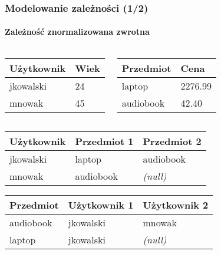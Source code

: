 \documentclass{beamer}
\begin{document}
	\begin{frame}
		\frametitle{Modelowanie zależności (1/2)}
		\framesubtitle{Zależność znormalizowana zwrotna}

		\begin{columns}[c]

				\begin{center}
					\begin{tabular}{l|l}
						\multicolumn{1}{c}{\textbf{Użytkownik}} & \textbf{Wiek} \\
						\hline
						\cellcolor{red!10}jkowalski & 24 \\
						\hline
						\cellcolor{red!10}mnowak & 45 \\
						\hline
					\end{tabular}
				\end{center}


				\begin{center}
					\begin{tabular}{l|l}
						\multicolumn{1}{c}{\textbf{Przedmiot}} & \textbf{Cena} \\
						\hline
						\cellcolor{red!10}laptop & 2276.99 \\
						\hline
						\cellcolor{red!10}audiobook & 42.40 \\
						\hline
					\end{tabular}
				\end{center}
		\end{columns}

		\begin{center}
			\begin{tabular}{l|l|l}
				\multicolumn{1}{c}{\textbf{Użytkownik}} & \multicolumn{1}{c}{\textbf{Przedmiot 1}} & \textbf{Przedmiot 2} \\
				\hline
				\cellcolor{red!10}jkowalski & laptop & audiobook \\
				\hline
				\cellcolor{red!10}mnowak & audiobook & \textit{(null)} \\
				\hline
			\end{tabular}
		\end{center}

		\begin{center}
			\begin{tabular}{l|l|l}
				\multicolumn{1}{c}{\textbf{Przedmiot}} & \multicolumn{1}{c}{\textbf{Użytkownik 1}} & \textbf{Użytkownik 2} \\
				\hline
				\cellcolor{red!10}audiobook & jkowalski & mnowak \\
				\hline
				\cellcolor{red!10}laptop & jkowalski & \textit{(null)} \\
				\hline
			\end{tabular}
		\end{center}
	\end{frame}
\end{document}
